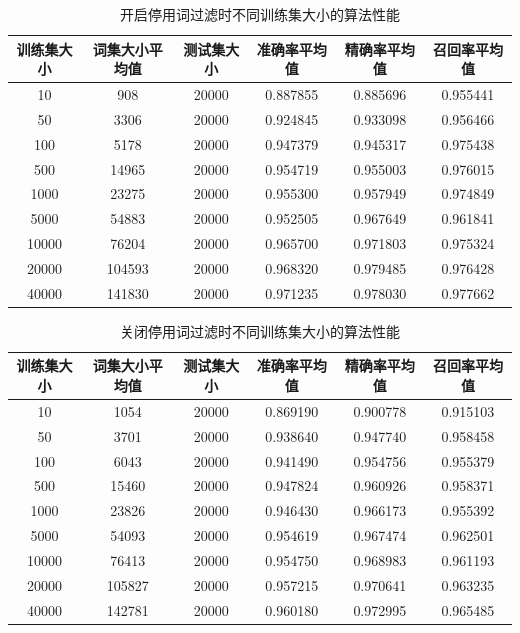 \documentclass[UTF8,zihao=-4]{ctexart}
\begin{document}
	\begin{table}[H]
		\centering
		\caption{开启停用词过滤时不同训练集大小的算法性能}
		\label{tab:stopwords-on-performance}
		\begin{tabular}{|c|c|c|c|c|c|}
			\hline
			训练集大小&词集大小平均值&测试集大小&准确率平均值&精确率平均值&召回率平均值\\
			\hline
			10&908&20000&0.887855&0.885696&0.955441\\
			\hline
			50&3306&20000&0.924845&0.933098&0.956466\\
			\hline
			100&5178&20000&0.947379&0.945317&0.975438\\
			\hline
			500&14965&20000&0.954719&0.955003&0.976015\\
			\hline
			1000&23275&20000&0.955300&0.957949&0.974849\\
			\hline
			5000&54883&20000&0.952505&0.967649&0.961841\\
			\hline
			10000&76204&20000&0.965700&0.971803&0.975324\\
			\hline
			20000&104593&20000&0.968320&0.979485&0.976428\\
			\hline
			40000&141830&20000&0.971235&0.978030&0.977662\\
			\hline
		\end{tabular}
	\end{table}

	\begin{table}[H]
		\centering
		\caption{关闭停用词过滤时不同训练集大小的算法性能}
		\label{tab:stopwords-off-performance}
		\begin{tabular}{|c|c|c|c|c|c|}
			\hline
			训练集大小&词集大小平均值&测试集大小&准确率平均值&精确率平均值&召回率平均值\\
			\hline
			10&1054&20000&0.869190&0.900778&0.915103\\
			\hline
			50&3701&20000&0.938640&0.947740&0.958458\\
			\hline
			100&6043&20000&0.941490&0.954756&0.955379\\
			\hline
			500&15460&20000&0.947824&0.960926&0.958371\\
			\hline
			1000&23826&20000&0.946430&0.966173&0.955392\\
			\hline
			5000&54093&20000&0.954619&0.967474&0.962501\\
			\hline
			10000&76413&20000&0.954750&0.968983&0.961193\\
			\hline
			20000&105827&20000&0.957215&0.970641&0.963235\\
			\hline
			40000&142781&20000&0.960180&0.972995&0.965485\\
			\hline
		\end{tabular}
	\end{table}
\end{document}
